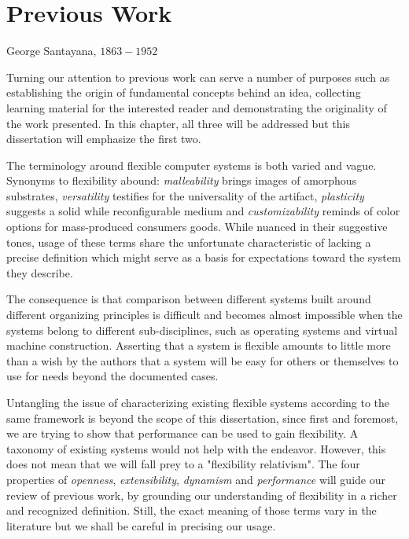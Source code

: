 \chapter{Previous Work}
\label{chap:PreviousWork} 

{George Santayana, $1863-1952$}

Turning our attention to previous work can serve a number of purposes such as
establishing the origin of fundamental concepts behind an idea, collecting
learning material for the interested reader and demonstrating the originality
of the work presented. In this chapter, all three will be addressed but this
dissertation will emphasize the first two. 

The terminology around flexible computer systems is both varied and vague.
Synonyms to flexibility abound: \textit{malleability} brings images of
amorphous substrates, \textit{versatility} testifies for the universality of
the artifact, \textit{plasticity} suggests a solid while reconfigurable medium
and \textit{customizability} reminds of color options for mass-produced
consumers goods. While nuanced in their suggestive tones, usage of these terms
share the unfortunate characteristic of lacking a precise definition which
might serve as a basis for expectations toward the system they describe.

The consequence is that comparison between different systems built around
different organizing principles is difficult and becomes almost impossible when
the systems belong to different sub-disciplines, such as operating systems and
virtual machine construction. Asserting that a system is flexible amounts to
little more than a wish by the authors that a system will be easy for others or
themselves to use for needs beyond the documented cases.  

Untangling the issue of characterizing existing flexible systems according to
the same framework is beyond the scope of this dissertation, since first and
foremost, we are trying to show that performance can be used to gain
flexibility. A taxonomy of existing systems would not help with the endeavor.
However, this does not mean that we will fall prey to a "flexibility
relativism". The four properties of \textit{openness}, \textit{extensibility},
\textit{dynamism} and \textit{performance} will guide our review of previous
work, by grounding our understanding of flexibility in a richer and recognized
definition. Still, the exact meaning of those terms vary in the literature but
we shall be careful in precising our usage.

